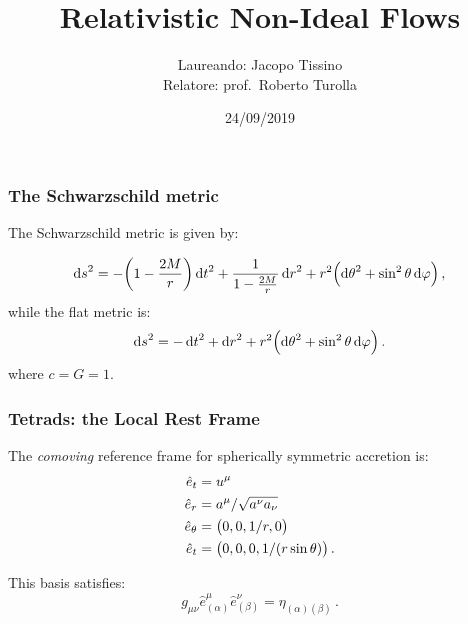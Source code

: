 \documentclass{beamer}
\title{Relativistic Non-Ideal Flows}
\author{Laureando: Jacopo Tissino \\
    Relatore: prof.\ Roberto Turolla}
\date{24/09/2019}
\begin{document}
\frame{\titlepage}

\begin{frame}
    \frametitle{The Schwarzschild metric}

    The Schwarzschild metric is given by:

    \begin{equation*}
    \dd{s}^2 = -\qty(1-\frac{2M}{r})\dd{t}^2 + \frac{1}{1-\frac{2M}{r}} \dd{r}^2
    + r^2 \qty(\dd{\theta}^2 + \sin^2\theta \dd{\varphi})\,,
    \end{equation*}
    while the flat metric is:
    \begin{equation*}
        \dd{s}^2 = -\dd{t}^2 + \dd{r}^2 + r^2 \qty(\dd{\theta}^2 + \sin^2\theta \dd{\varphi})\,.
    \end{equation*}
    where \(c = G = 1\).


\end{frame}

%
%

\begin{frame}
    \frametitle{Tetrads: the Local Rest Frame}

    The \emph{comoving} reference frame for spherically symmetric accretion is:
    \begin{align*}
      \hat{e}_t &= u^\mu  \\
      \hat{e}_r &= a^\mu / \sqrt{a^\nu a_\nu}   \\
      \hat{e}_\theta &= \qty(0,0,1/r,0)  \\
      \hat{e}_t &= \qty(0,0,0,1/(r \sin\theta))\,.
    \end{align*}

    This basis satisfies:
    \begin{equation*}
        g_{\mu\nu} \hat{e}^\mu _{(\alpha)} \hat{e}^\nu _{(\beta)} = \eta_{(\alpha) (\beta)}\,.
    \end{equation*}


\end{frame}
\end{document}
